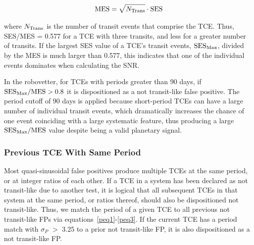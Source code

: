 \begin{equation}
{\rm MES} = \sqrt{N_{\rm Trans}} \cdot {\rm SES}
\end{equation}

\noindent where $N_{\rm Trans}$ is the number of transit events that comprise the TCE. Thus, SES/MES = 0.577 for a TCE with three transits, and less for a greater number of transits. If the largest SES value of a TCE's transit events, ${\rm SES}_{\rm Max}$, divided by the MES is much larger than 0.577, this indicates that one of the individual events dominates when calculating the SNR.

In the robovetter, for TCEs with periods greater than 90 days, if ${{\rm SES}_{\rm Max} / {\rm MES} > 0.8}$ it is dispositioned as a not transit-like false positive. The period cutoff of 90 days is applied because short-period TCEs can have a large number of individual transit events, which dramatically increases the chance of one event coinciding with a large systematic feature, thus producing a large ${{\rm SES}_{\rm Max} / {\rm MES}}$ value despite being a valid planetary signal.



\subsubsection{Previous TCE With Same Period}
\label{s:sameperiod}
Most quasi-sinusoidal false positives produce multiple TCEs at the same period, or at integer ratios of each other. If a TCE in a system has been declared as not transit-like due to another test, it is logical that all subsequent TCEs in that system at the same period, or ratios thereof, should also be dispositioned not transit-like. Thus, we match the period of a given TCE to all previous not transit-like FPs via equations~\ref{peq1}-\ref{peq3}. If the current TCE has a period match with $\sigma_{P}$ $>$ 3.25 to a prior not transit-like FP, it is also dispositioned as a not transit-like FP.

